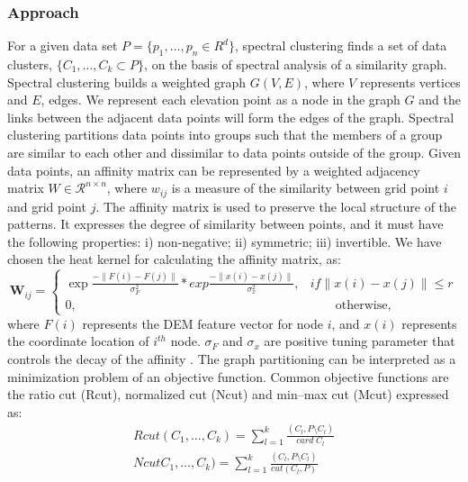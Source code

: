\documentclass[12pt,letterpaper]{article}
\begin{document}
\subsubsection{Approach}
For a given data set $P = \{ p_1,\dots, p_n \in R^d \}$, spectral clustering finds a set of data clusters, $\{C_1,\dots, C_k \subset P\}$,
on the basis of spectral analysis of a similarity graph. Spectral clustering builds a weighted graph $G(V,E)$, where $V$ represents vertices and $E$, edges. 
We represent each elevation point as a node in the graph $G$ and the links between the adjacent data points will form the edges of the graph. Spectral clustering partitions data points into groups such that the members of a group are similar to each other and dissimilar to data points outside of the group. Given data points, an affinity matrix can be represented by a weighted adjacency matrix $W \in \mathcal{R}^{n\times n}$, where $w_{ij}$ is a measure
of the similarity between grid point $i$ and grid point $j$. The affinity matrix is used to preserve the local structure of the patterns. It expresses the degree of similarity between points, and
it must have the following properties: i) non-negative; ii) symmetric; iii) invertible.
We have chosen the heat kernel for calculating the affinity matrix, as:
\begin{equation}
{\mathbf W_{ij}} = \left\{
\begin{array}{rl}
\exp{\frac{- \parallel F(i) - F(j) \parallel}{\sigma_F^2}}*exp{\frac{- \parallel x(i) - x(j) \parallel}{\sigma_x^2}}, & if \parallel x(i) - x(j) \parallel \le r\\
0, & \qquad \text{otherwise},
\end{array} 
\right.
\label{eq:eq1}
\end{equation} 
where $F(i)$ represents the DEM feature vector for node $i$, and $x(i)$ represents the coordinate location of $i^{th}$ node.
$\sigma_F $ and $\sigma_x$ are positive tuning parameter that controls the decay of the affinity \citep{Tung2010}.
The graph partitioning can be interpreted as a minimization problem of an objective function. Common objective functions are
the ratio cut (Rcut), normalized cut (Ncut) and min--max cut (Mcut) expressed as:
\begin{align}
Rcut (C_1,\dots,C_k) = \sum_{l=1}^k \frac{(C_l, P \setminus C_l)}{card\; C_l} \\
Ncut C_1,\dots,C_k) = \sum_{l=1}^k \frac{(C_l, P \setminus C_l)}{cut (C_l, P)}
\end{align}
\end{document}
